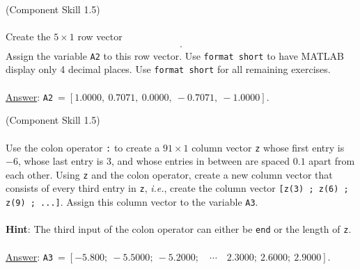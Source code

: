\documentclass[12pt]{article}
\newenvironment{exercise}[2][\large Exercise]{\begin{trivlist}
\item[\centering \Large \hskip \labelsep {\bfseries #1}\hskip \labelsep {\bfseries #2.}]}{\end{trivlist}}
\begin{document}
\vspace{1cm}

\begin{exercise}{\large 2} {\large (Component Skill 1.5)} ~\\\\
Create the $5 \times 1$ row vector \begin{align*}[\cos(0),\cos(\pi/4),\cos(\pi/2),\cos(3\pi/4),\cos(\pi)].
\end{align*}
Assign the variable \verb|A2| to this row vector. Use \verb|format short| to have MATLAB display only 4 decimal places. Use \verb|format short| for all remaining exercises. \\\\
\underline{Answer}: \verb|A2|$~= [1.0000, ~0.7071, ~0.0000, ~-0.7071, ~-1.0000]$.
\end{exercise}

\vspace{1cm}
\begin{exercise}{\large 3} {\large (Component Skill 1.5)} ~\\\\
Use the colon operator \verb|:| to create a $91 \times 1$ column vector \verb|z| whose first entry is $-6$, whose last entry is $3$, and whose entries in between are spaced $0.1$ apart from each other. Using \verb|z| and the colon operator, create a new column vector that consists of every third entry in \verb|z|, \emph{i.e.}, create the column vector \verb|[z(3) ; z(6) ; z(9) ; ...]|. Assign this column vector to the variable \verb|A3|. \\\\
\textbf{Hint}: The third input of the colon operator can either be \verb|end| or the length of \verb|z|. \\\\
\underline{Answer}: \verb|A3|$~= [-5.800;~-5.5000;~-5.2000; \quad \cdots \quad 2.3000; ~2.6000; ~ 2.9000]$.
\end{exercise}
\end{document}

